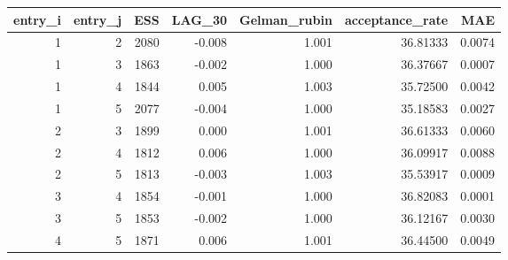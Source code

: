 \begin{longtable}{rrrrrrr}
\toprule
entry\_i & entry\_j & ESS & LAG\_30 & Gelman\_rubin & acceptance\_rate & MAE \\ 
\midrule
1 & 2 & 2080 & -0.008 & 1.001 & 36.81333 & 0.0074 \\ 
1 & 3 & 1863 & -0.002 & 1.000 & 36.37667 & 0.0007 \\ 
1 & 4 & 1844 & 0.005 & 1.003 & 35.72500 & 0.0042 \\ 
1 & 5 & 2077 & -0.004 & 1.000 & 35.18583 & 0.0027 \\ 
2 & 3 & 1899 & 0.000 & 1.001 & 36.61333 & 0.0060 \\ 
2 & 4 & 1812 & 0.006 & 1.000 & 36.09917 & 0.0088 \\ 
2 & 5 & 1813 & -0.003 & 1.003 & 35.53917 & 0.0009 \\ 
3 & 4 & 1854 & -0.001 & 1.000 & 36.82083 & 0.0001 \\ 
3 & 5 & 1853 & -0.002 & 1.000 & 36.12167 & 0.0030 \\ 
4 & 5 & 1871 & 0.006 & 1.001 & 36.44500 & 0.0049 \\ 
\bottomrule
\end{longtable}

